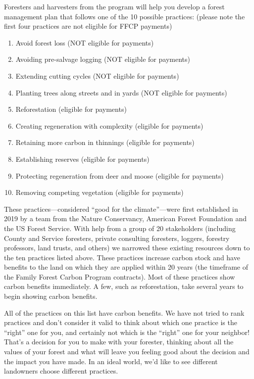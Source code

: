 \documentclass{article}\usepackage[]{graphicx}\usepackage[]{color}
\begin{document}
Foresters and harvesters from the program will help you develop a forest management plan that follows one of the 10 possible practices: (please note the first four practices are not eligible for FFCP payments)

\begin{enumerate}
\item Avoid forest loss (NOT eligible for payments)
\item Avoiding pre-salvage logging (NOT eligible for payments)
\item Extending cutting cycles (NOT eligible for payments)
\item Planting trees along streets and in yards (NOT eligible for payments)
\item Reforestation (eligible for payments)
\item Creating regeneration with complexity (eligible for payments)
\item Retaining more carbon in thinnings (eligible for payments)
\item Establishing reserves (eligible for payments)
\item Protecting regeneration from deer and moose (eligible for payments)
\item Removing competing vegetation (eligible for payments)
\end{enumerate}

These practices---considered ``good for the climate''---were first established in 2019 by a team from the Nature Conservancy, American Forest Foundation and the US Forest Service. With help from a group of 20 stakeholders (including County and Service foresters, private consulting foresters, loggers, forestry professors, land trusts, and others) we narrowed these existing resources down to the ten practices listed above. These practices increase carbon stock and have benefits to the land on which they are applied within 20 years (the timeframe of the Family Forest Carbon Program contracts). Most of these practices show carbon benefits immediately. A few, such as reforestation, take several years to begin showing carbon benefits.

All of the practices on this list have carbon benefits. We have not tried to rank practices and don't consider it valid to think about which one practice is the ``right'' one for you, and certainly not which is the ``right'' one for your neighbor! That's a decision for you to make with your forester, thinking about all the values of your forest and what will leave you feeling good about the decision and the impact you have made. In an ideal world, we'd like to see different landowners choose different practices.
\end{document}

